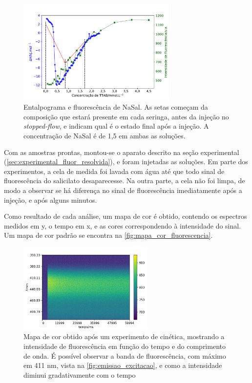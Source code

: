 	\begin{figure}[h]
		\centering
		\includegraphics[width=0.7\textwidth]{imagens/fluor/itc_experimento_cinetica}
		\caption{Entalpograma e fluorescência de NaSal. As setas começam da composição que estará presente em cada seringa, antes da injeção no \emph{stopped-flow}, e indicam qual é o estado final após a injeção. A concentração de NaSal é de 1,5 \mM{} em ambas as soluções.}
		\label{fig:itc_experimento_cinetica}
	\end{figure}
	
	Com as amostras prontas, montou-se o aparato descrito na seção experimental (\autoref{sec:experimental_fluor_resolvida}), e foram injetadas as soluções. Em parte dos experimentos, a cela de medida foi lavada com água até que todo sinal de fluorescência do salicilato desaparecesse. Na outra parte, a cela não foi limpa, de modo a observar se há diferença no sinal de fluorescência imediatamente após a injeção, e após alguns minutos.
	
	Como resultado de cada análise, um mapa de cor é obtido, contendo os espectros medidos em y, o tempo em x, e as cores correspondendo à intensidade do sinal. Um mapa de cor padrão se encontra na \autoref{fig:mapa_cor_fluorescencia}.
	
	\begin{figure}[h]
		\centering
		\includegraphics[width=0.6\textwidth]{imagens/fluor/mapa_cor_am49}
		\caption{Mapa de cor obtido após um experimento de cinética, mostrando a intensidade de fluorescência em função do tempo e do comprimento de onda. É possível observar a banda de fluorescência, com máximo em 411 nm, vista na \autoref{fig:emissao_excitacao}, e como a intensidade diminui gradativamente com o tempo}
		\label{fig:mapa_cor_fluorescencia}
	\end{figure}
	
